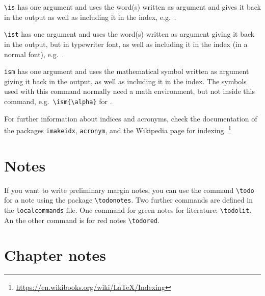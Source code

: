 \begin{itemize*}
	\item \verb|\is| has one argument and uses the word(s) written as argument and gives it back in the output as well as including it in the index, e.g.\ .
	
	\item \verb|\ist| has one argument and uses the word(s) written as argument giving it back in the output, but in typewriter font, as well as including it in the index (in a normal font), e.g.\ .
	
	\item \verb|ism| has one argument and uses the mathematical symbol written as argument giving it back in the output, as well as including it in the index. The symbols used with this command normally need a math environment, but not inside this command, e.g.\ \verb|\ism{\alpha}| for \ism{\alpha}.
\end{itemize*}


For further information about indices and acronyms, check the documentation of the packages \verb|imakeidx|, \verb|acronym|, and the Wikipedia page for indexing.%
%
\footnote{\url{https://en.wikibooks.org/wiki/LaTeX/Indexing}} %
%




\section{Notes}
\label{ch:Notes}


\noindent If you want to write preliminary margin notes,  you can use the command \texttt{\textbackslash todo} for a note using the package \texttt{\textbackslash todonotes}. Two further commands are defined in the \texttt{localcommands} file. One command for green notes for literature: \texttt{\textbackslash todolit}.  An the other command is for red notes \texttt{\textbackslash todored}. 


\section{Chapter notes}
\label{ch:Chapternotes}


